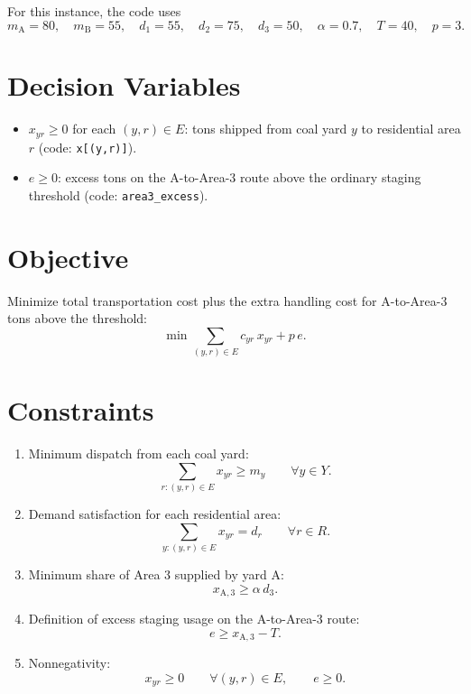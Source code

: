 For this instance, the code uses
\[
m_{\mathrm{A}}=80,\quad m_{\mathrm{B}}=55,\quad
d_1=55,\quad d_2=75,\quad d_3=50,\quad
\alpha=0.7,\quad T=40,\quad p=3.
\]

\section*{Decision Variables}

\begin{itemize}
    \item $x_{yr}\ge 0$ for each $(y,r)\in E$: tons shipped from coal yard $y$ to residential area $r$ (code: \texttt{x[(y,r)]}).
    \item $e\ge 0$: excess tons on the A-to-Area-3 route above the ordinary staging threshold (code: \texttt{area3\_excess}).
\end{itemize}

\section*{Objective}

Minimize total transportation cost plus the extra handling cost for A-to-Area-3 tons above the threshold:
\[
\min \sum_{(y,r)\in E} c_{yr}\,x_{yr} + p\,e.
\]

\section*{Constraints}

\begin{enumerate}
    \item Minimum dispatch from each coal yard:
    \[
    \sum_{r:(y,r)\in E} x_{yr} \ge m_y
    \qquad \forall y\in Y.
    \]

    \item Demand satisfaction for each residential area:
    \[
    \sum_{y:(y,r)\in E} x_{yr} = d_r
    \qquad \forall r\in R.
    \]

    \item Minimum share of Area 3 supplied by yard A:
    \[
    x_{\mathrm{A},3} \ge \alpha\, d_3.
    \]

    \item Definition of excess staging usage on the A-to-Area-3 route:
    \[
    e \ge x_{\mathrm{A},3} - T.
    \]

    \item Nonnegativity:
    \[
    x_{yr}\ge 0 \qquad \forall (y,r)\in E,
    \qquad
    e\ge 0.
    \]
\end{enumerate}

